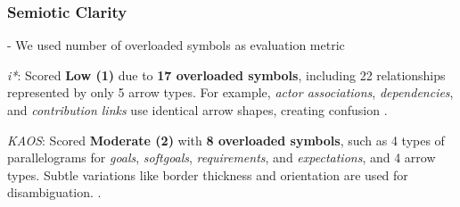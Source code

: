 \documentclass[runningheads]{llncs}
\begin{document}
\begin{table}[h!]
\centering
\caption{Overall Evaluation Scores by Principle\label{tab:overall_results}}
\end{table}

\subsubsection{Semiotic Clarity} - We used number of overloaded symbols as evaluation metric 

\textit{i*}: Scored \textbf{Low (1)} due to \textbf{17 overloaded symbols}, including 22 relationships represented by only 5 arrow types. For example, \textit{actor associations}, \textit{dependencies}, and \textit{contribution links} use identical arrow shapes, creating confusion \cite{Moody2010}.

\textit{KAOS}: Scored \textbf{Moderate (2)} with \textbf{8 overloaded symbols}, such as 4 types of parallelograms for \textit{goals}, \textit{softgoals}, \textit{requirements}, and \textit{expectations}, and 4 arrow types. Subtle variations like border thickness and orientation are used for disambiguation. \cite{Matulevicius2007}.
\end{document}
